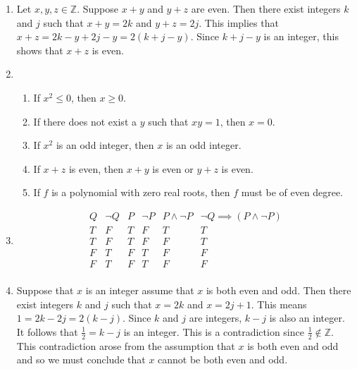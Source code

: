 \documentclass[a4paper]{article}
\begin{document}
\begin{enumerate}
\begin{enumerate}
	\end{enumerate}

\item

Let $x,y,z \in \mathbb{Z}$. Suppose $x+y$ and $y+z$ are even. Then there exist integers $k$ and $j$ such that $x + y = 2k$ and $y+z = 2j$. This implies that $x + z = 2k - y + 2j - y = 2(k+j-y)$. Since $k+j-y$ is an integer, this shows that $x+z$ is even.

\item

	\begin{enumerate}
	\item
	
	If $x^2 \leq 0$, then $x \geq 0$. 
	
	\item
	
	If there does not exist a $y$ such that $xy = 1$, then
	$x = 0$.
	
	\item
	
	If $x^2$ is an odd integer, then $x$ is an odd integer.
	
	\item
	
	If $x+z$ is even, then $x+y$ is even or $y+z$ is even.
	
	\item
	
	If $f$ is a polynomial with zero real roots, then $f$ 
	must be of even degree.
	
	\end{enumerate}

\item

\begin{displaymath}
	\begin{array}{|c|c|c|c|c|c|}
	Q & \neg Q & P & \neg P & P \land \neg P
	& \neg Q \implies (P \land \neg P)\\
	\hline
	T & F & T & F & T & T\\
	T & F & T & F & F & T\\
	F & T & F & T & F & F\\
	F & T & F & T & F & F\\
	\end{array}
	\end{displaymath}

\item

Suppose that $x$ is an integer assume that $x$ is both even and odd. Then there exist integers $k$ and $j$ such that $x = 2k$ and $x = 2j + 1$. This means $1 = 2k - 2j = 2(k-j)$. Since $k$ and $j$ are integers, $k - j$ is also an integer. It follows that $\frac{1}{2} = k-j$ is an integer. This is a contradiction since $\frac{1}{2} \not\in \mathbb{Z}$. This contradiction arose from the assumption that $x$ is both even and odd and so we must conclude that $x$ cannot be both even and odd. 

	
\end{enumerate}
\end{document}

